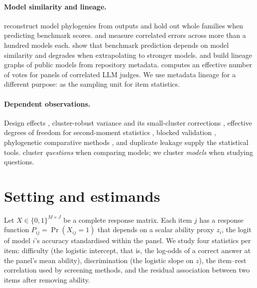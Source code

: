\documentclass[10pt]{article}
\theoremstyle{remark}\newtheorem{remark}{Remark}
\begin{document}
\paragraph{Model similarity and lineage.}
\citet{yax2025phylolm} reconstruct model phylogenies from outputs and hold out
whole families when predicting benchmark scores. \citet{kim2025correlated} and
\citet{goel2025great} measure correlated errors across more than a hundred
models each. \citet{zhang2025benchmarkprediction} show that benchmark
prediction depends on model similarity and degrades when extrapolating to
stronger models. \citet{laufer2025anatomy} and \citet{horwitz2025atlas} build
lineage graphs of public models from repository metadata.
\citet{kohli2026nine} computes an effective number of votes for panels of
correlated LLM judges. We use metadata lineage for a different purpose: as the
sampling unit for item statistics.

\paragraph{Dependent observations.}
Design effects \citep{kish1965survey}, cluster-robust variance and its
small-cluster corrections
\citep{liang1986longitudinal,cameron2015practitioner,carter2017asymptotic,mackinnon2023cluster},
effective degrees of freedom for second-moment statistics
\citep{bretherton1999effective}, blocked validation
\citep{roberts2017crossvalidation}, phylogenetic comparative methods
\citep{felsenstein1985phylogenies}, and duplicate leakage
\citep{allamanis2019duplication,kapoor2022leakage} supply the statistical
tools. \citet{miller2024errorbars} cluster \emph{questions} when comparing
models; we cluster \emph{models} when studying questions.

\section{Setting and estimands}\label{sec:setup}
Let $X\in\{0,1\}^{M\times J}$ be a complete response matrix. Each item $j$ has
a response function $P_{ij}=\Pr(X_{ij}=1)$ that depends on a scalar ability
proxy $z_i$, the logit of model $i$'s accuracy standardised within the panel.
We study four statistics per item: difficulty (the logistic intercept, that is,
the log-odds of a correct answer at the panel's mean ability), discrimination
(the logistic slope on $z$), the item--rest correlation used by screening
methods, and the residual association between two items after removing
ability.
\end{document}
